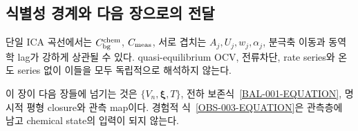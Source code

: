 \subsection{식별성 경계와 다음 장으로의 전달}\label{EQ-CH1-IDENT}

\begin{identifiability}
단일 ICA 곡선에서는 $C_{\mathrm{bg}}^{\mathrm{chem}}$, $C_{\rm meas}$, 서로 겹치는
$A_j,U_j,w_j,\alpha_j$, 분극축 이동과 동역학 lag가 강하게
상관될 수 있다. quasi-equilibrium OCV, 전류차단, rate series와
온도 series 없이 이들을 모두 독립적으로 해석하지 않는다.
\end{identifiability}

이 장이 다음 장들에 넘기는 것은
$\{V_n,\bm\xi,T\}$, 전하 보존식~\eqref{BAL-001-EQUATION}, 명시적 평형
closure와 관측 map이다. 경험적 식~\eqref{OBS-003-EQUATION}은
관측층에 남고 chemical state의 입력이 되지 않는다.
